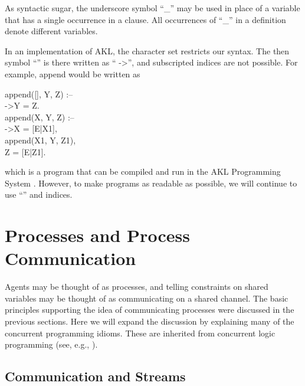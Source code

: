 As syntactic sugar, the underscore symbol ``{\prog _}'' may be used in
place of a variable that has a single occurrence in a clause.  All
occurrences of ``{\prog _}'' in a definition denote different
variables.

In an implementation of AKL, the character set restricts our
syntax.  The then symbol ``{\prog \cond}'' is there written as ``{\prog
->}'', and subscripted indices are not possible.  For example, append
would be written as
%
\begin{program}
append([], Y, Z) :-- \\
\>->\>Y = Z.  \\
append(X, Y, Z) :-- \\
\>->\>X = [E|X1], \\
\>  \>append(X1, Y, Z1), \\
\>  \>Z = [E|Z1].
\end{program}%
%
which is a program that can be compiled and run in the AKL Programming
System \cite{jamo92}.  However, to make programs as readable as
possible, we will continue to use ``{\prog \cond}'' and indices.


\section{Processes and Process Communication}

Agents may be thought of as processes, and telling constraints on
shared variables may be thought of as communicating on a shared
channel.  The basic principles supporting the idea of communicating
processes were discussed in the previous sections.  Here we will
expand the discussion by explaining many of the concurrent programming
idioms.  These are inherited from concurrent logic programming (see,
e.g., \cite{sha87}).

\subsection{Communication and Streams}

